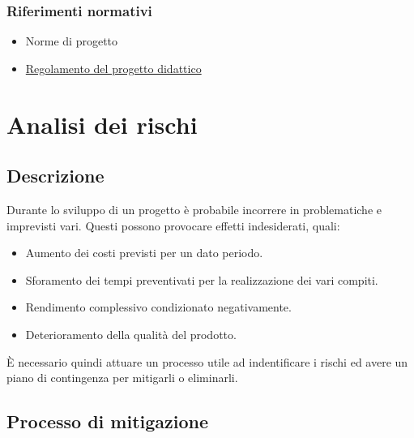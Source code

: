 \documentclass{article}
\begin{document}
\subsubsection{Riferimenti normativi}
\begin{itemize}
\item Norme di progetto
\item \href {https://www.math.unipd.it/~tullio/IS-1/2023/Dispense/PD2.pdf} {Regolamento del progetto didattico}
\end{itemize}


\section{Analisi dei rischi}
\subsection{Descrizione}
Durante lo sviluppo di un progetto è probabile incorrere in problematiche e imprevisti vari. Questi possono provocare effetti indesiderati, quali:
\begin{itemize}
    \item Aumento dei costi previsti per un dato periodo.
    \item Sforamento dei tempi preventivati per la realizzazione dei vari compiti.
    \item Rendimento complessivo condizionato negativamente.
    \item Deterioramento della qualità del prodotto.
\end{itemize}
È necessario quindi attuare un processo utile ad indentificare i rischi ed avere un piano di contingenza per mitigarli o eliminarli.

\subsection{Processo di mitigazione}
\end{document}
